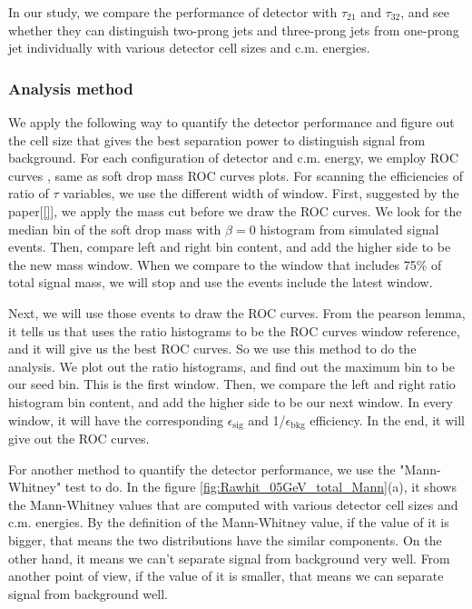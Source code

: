 In our study, we compare the performance of detector with $\tau_{21}$ and $\tau_{32}$, and see whether they can distinguish two-prong jets and three-prong jets from one-prong jet individually with various detector cell sizes and c.m. energies.\\
\subsubsection{Analysis method}\label{Analysis}
We apply the following way to quantify the detector performance and figure out the cell size that gives the best separation power to distinguish signal from background. For each configuration of detector and c.m. energy, we employ ROC curves , same as soft drop mass ROC curves plots.  For scanning the efficiencies of ratio of $\tau$ variables, we use the different width of window. First, suggested by the paper[\ref{}], we apply the mass cut before we draw the ROC curves.  We look for the median bin of the soft drop mass with $\beta=0$ histogram from simulated signal events.  Then, compare left and right bin content, and add the higher side to be the new mass window. When we compare to the window that includes 75\% of total signal mass, we will stop and use the events include the latest window.

Next, we will use those events to draw the ROC curves. From the pearson lemma, it tells us that uses the ratio histograms to be the ROC curves window reference, and it will give us the best ROC curves. So we use this method to do the analysis. We plot out the ratio histograms, and find out the maximum bin to be our seed bin. This is the first window. Then, we compare the left and right ratio histogram bin content, and add the higher side to be our next window. In every window, it will have the corresponding $\epsilon_\mathrm{sig}$  and 1/$\epsilon_\mathrm{bkg}$  efficiency. In the end, it will give out the ROC curves.

For another method to quantify the detector performance, we use the "Mann-Whitney" test to do. In the figure \ref{fig:Rawhit_05GeV_total_Mann}(a), it shows the Mann-Whitney values that are computed with various detector cell sizes and c.m. energies. By the definition of the Mann-Whitney value, if the value of it is bigger, that means the two distributions have the similar components. On the other hand, it means we can't separate signal from background very well. From another point of view, if the value of it is smaller, that means we can separate signal from background well.

